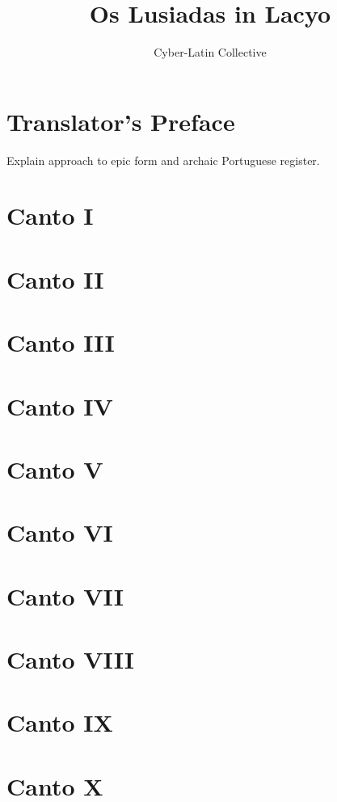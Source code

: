 \documentclass[12pt]{book}
\title{Os Lusiadas in Lacyo}
\author{Cyber-Latin Collective}
\date{}
\begin{document}
\maketitle
\tableofcontents

\chapter{Translator's Preface}
Explain approach to epic form and archaic Portuguese register.

\chapter{Canto I}
\chapter{Canto II}
\chapter{Canto III}
\chapter{Canto IV}
\chapter{Canto V}
\chapter{Canto VI}
\chapter{Canto VII}
\chapter{Canto VIII}
\chapter{Canto IX}
\chapter{Canto X}
\end{document}
